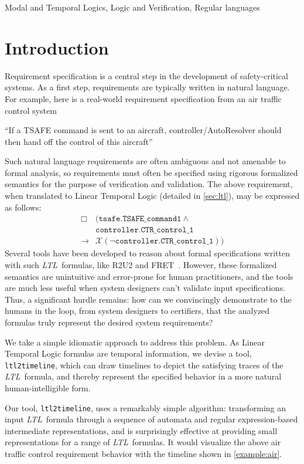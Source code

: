 \documentclass[conference]{IEEEtran}
\theoremstyle{definition}
\theoremstyle{remark}
\newcommand{\always}{\Box}
\newcommand{\nextt}{\mathcal{X}}
\newcommand{\limplies}{\rightarrow}
\newcommand{\ltl}{\textit{LTL}}
\newcommand{\tool}{\hspace{0.1cm}\texttt{ltl2timeline}}
\begin{document}
\begin{IEEEkeywords}
Modal and Temporal Logics, Logic and Verification, Regular languages
\end{IEEEkeywords}

\section{Introduction}
Requirement specification is a central step in the development of safety-critical systems. As a first step, requirements are typically written in natural language. For example, here is a real-world requirement specification from an air traffic control system~\cite{ZR14}
\begin{center}
    ``If a TSAFE command is sent to an aircraft, controller/AutoResolver should then hand off the control of this aircraft''
\end{center}
Such natural language requirements are often ambiguous and not amenable to formal analysis, so requirements must often be specified using rigorous formalized semantics for the purpose of verification and validation. The above requirement, when translated to Linear Temporal Logic (detailed in \cref{sec:ltl}), may be expressed as follows:
\begin{align*}
    \always & (\texttt{tsafe.TSAFE\_command1} \land \\ & \texttt{controller.CTR\_control\_1} \\
    \limplies & \nextt (\neg \texttt{controller.CTR\_control\_1}))
\end{align*}
Several tools have been developed to reason about formal specifications written with such \ltl\ formulas, like R2U2 and FRET~\cite{GPMS20}. However, these formalized semantics are unintuitive and error-prone for human practitioners, and the tools are much less useful when system designers can't validate input specifications.
Thus, a significant hurdle remains: how can we convincingly demonstrate to the humans in the loop, from system designers to certifiers, that the analyzed formulas truly represent the desired system requirements? %

We take a simple idiomatic approach to address this problem. As Linear Temporal Logic formulas are temporal information, we devise a tool, \tool, which can draw timelines to depict the satisfying traces of the \ltl\ formula, and thereby represent the specified behavior in a more natural human-intelligible form.

Our tool, \tool, uses a remarkably simple algorithm: transforming an input \ltl\ formula through a sequence of automata and regular expression-based intermediate representations, and is surprisingly effective at providing small representations for a range of \ltl\ formulas. It would visualize the above air traffic control requirement behavior with the timeline shown in \cref{example:air}.
\end{document}
